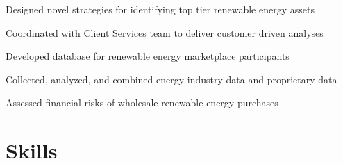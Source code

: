 \documentclass[]{deedy-resume-openfont}
\begin{document}
\begin{minipage}[t]{0.66\textwidth}
\begin{tightemize}
\item Designed novel strategies for identifying top tier renewable energy assets
\item Coordinated with Client Services team to deliver customer driven analyses
\item Developed database for renewable energy marketplace participants
\item Collected, analyzed, and combined energy industry data and proprietary data
\item Assessed financial risks of wholesale renewable energy purchases
\end{tightemize}
\sectionsep





\section{Skills}


\end{minipage}
\end{document}
